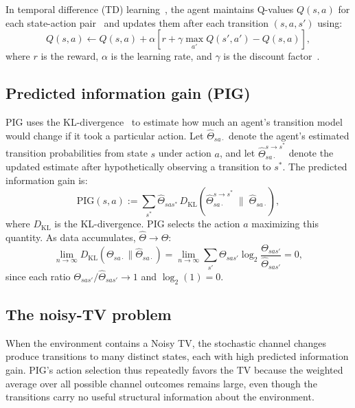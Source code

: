 \documentclass[letterpaper]{article}
\begin{document}
In temporal difference (TD) learning~\citep{Sutton1998}, the agent
maintains Q-values $Q(s,a)$ for each state-action
pair~\citep{Watkins1992Qlearning} and updates them after each
transition $(s,a,s')$ using:
\begin{equation}
  Q(s,a) \leftarrow Q(s,a) + \alpha \left[r + \gamma \max_{a'} Q(s',a') - Q(s,a)\right],
  \label{eq:TDQVF}
\end{equation}
where $r$ is the reward, $\alpha$ is the learning rate, and $\gamma$
is the discount factor~\citep{Sutton1998}.

\subsection{Predicted information gain (PIG)}

PIG uses the KL-divergence~\citep{Kullback1951information} to estimate
how much an agent's transition model would change if it took a
particular action.  Let
$\hat{\Theta}_{sa\cdot}$ denote the agent's estimated transition
probabilities from state $s$ under action $a$, and let
$\hat{\Theta}_{sa\cdot}^{s \to s^*}$ denote the updated estimate
after hypothetically observing a transition to $s^*$.  The predicted
information gain is:
\begin{equation}
  \textrm{PIG}(s,a) := \sum_{s^*} \hat{\Theta}_{sas^*}\,
  D_{\textrm{KL}}\!\left(\hat{\Theta}_{sa\cdot}^{s \to s^*}
  \;\|\;\hat{\Theta}_{sa\cdot}\right),
  \label{eq:PIG}
\end{equation}
where $D_{\textrm{KL}}$ is the KL-divergence.  PIG selects the action
$a$ maximizing this quantity.  As data accumulates,
$\hat{\Theta} \to \Theta$:
\[
  \lim_{n \to \infty} D_{\textrm{KL}}(\Theta_{sa\cdot} \| \hat{\Theta}_{sa\cdot}) =
  \lim_{n \to \infty} \sum_{s'} \Theta_{sas'} \log_2 \frac{\Theta_{sas'}}{\hat{\Theta}_{sas'}} = 0,
\]
since each ratio $\Theta_{sas'}/\hat{\Theta}_{sas'} \to 1$ and
$\log_2(1) = 0$.

\subsection{The noisy-TV problem}

When the environment contains a Noisy TV, the stochastic channel
changes produce transitions to many distinct states, each with high
predicted information gain.  PIG's action selection thus repeatedly
favors the TV because the weighted average over all possible channel
outcomes remains large, even though the transitions carry no useful
structural information about the environment.
\end{document}
